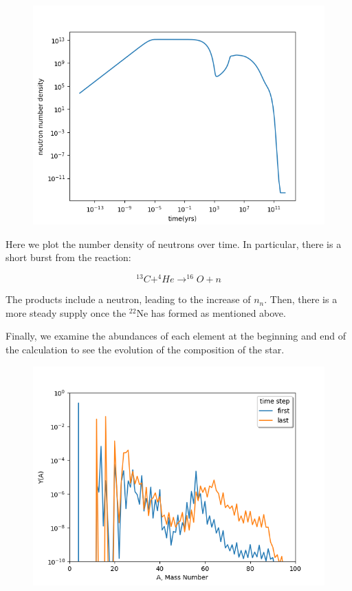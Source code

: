 \documentclass[manuscript]{aastex62}
\begin{document}
\begin{figure}[H]
\includegraphics[scale=0.7]{neutron}
\end{figure}

Here we plot the number density of neutrons over time. In particular, there is a short burst from the reaction:

\begin{equation}
^{13}C + ^4He \rightarrow ^{16}O + n
\end{equation}

The products include a neutron, leading to the increase of $n_n$. Then, there is a more steady supply once the $^{22}$Ne has formed as mentioned above.

Finally, we examine the abundances of each element at the beginning and end of the calculation to see the evolution of the composition of the star. 

\begin{figure}[H]
\includegraphics[scale=0.7]{task3_2}
\end{figure}
\end{document}
